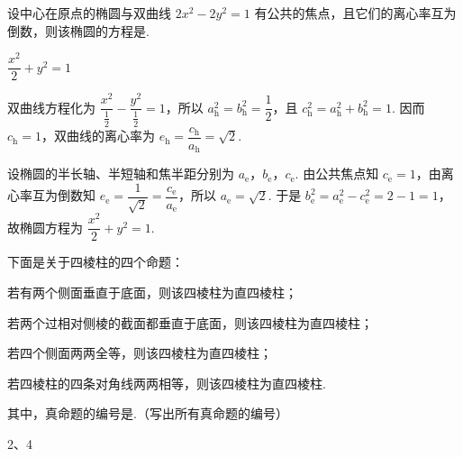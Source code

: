 \begin{problem}
设中心在原点的椭圆与双曲线 \(2x^2-2y^2=1\) 有公共的焦点，且它们的离心率互为倒数，则该椭圆的方程是\fillinblank{}.
\end{problem}

\begin{answer}
\(\dfrac{x^2}{2}+y^2=1\)
\end{answer}

\begin{solution}
双曲线方程化为 \(\dfrac{x^2}{\frac{1}{2}}-\dfrac{y^2}{\frac{1}{2}}=1\)，所以 \(a_{\mathrm h}^2=b_{\mathrm h}^2=\dfrac{1}{2}\)，且 \(c_{\mathrm h}^2=a_{\mathrm h}^2+b_{\mathrm h}^2=1\). 因而 \(c_{\mathrm h}=1\)，双曲线的离心率为 \(e_{\mathrm h}=\dfrac{c_{\mathrm h}}{a_{\mathrm h}}=\sqrt2\).

设椭圆的半长轴、半短轴和焦半距分别为 \(a_{\mathrm e}\)，\(b_{\mathrm e}\)，\(c_{\mathrm e}\). 由公共焦点知 \(c_{\mathrm e}=1\)，由离心率互为倒数知 \(e_{\mathrm e}=\dfrac{1}{\sqrt2}=\dfrac{c_{\mathrm e}}{a_{\mathrm e}}\)，所以 \(a_{\mathrm e}=\sqrt2\). 于是 \(b_{\mathrm e}^2=a_{\mathrm e}^2-c_{\mathrm e}^2=2-1=1\)，故椭圆方程为 \(\dfrac{x^2}{2}+y^2=1\).
\end{solution}

\begin{problem}
下面是关于四棱柱的四个命题：

\begin{circlelist}
\item 若有两个侧面垂直于底面，则该四棱柱为直四棱柱；
\item 若两个过相对侧棱的截面都垂直于底面，则该四棱柱为直四棱柱；
\item 若四个侧面两两全等，则该四棱柱为直四棱柱；
\item 若四棱柱的四条对角线两两相等，则该四棱柱为直四棱柱.
\end{circlelist}

其中，真命题的编号是\fillinblank{}.（写出所有真命题的编号）
\end{problem}

\begin{answer}
2、4
\end{answer}

